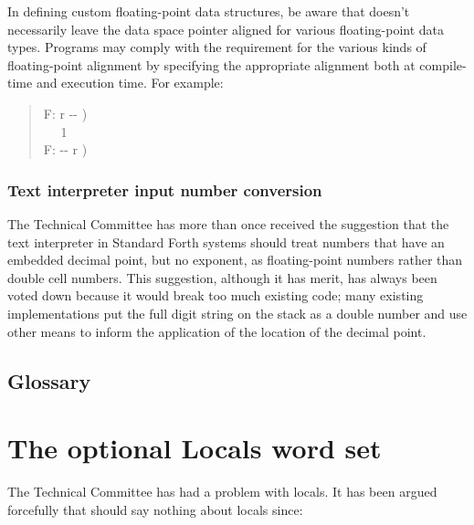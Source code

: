 In defining custom floating-point data structures, be aware that
 doesn't necessarily leave the data space pointer
aligned for various floating-point data types. Programs may comply
with the requirement for the various kinds of floating-point alignment
by specifying the appropriate alignment both at compile-time and
execution time. For example:

\begin{quote}\ttfamily
	\word{:}   F: r -{}- ) \\
	\tab {}  ~~
		1   ~ \\
	\tab {}  F: -{}- r )
		~  \word{;}
\end{quote}

\setcounter{subsubsection}{6}
\subsubsection{Text interpreter input number conversion} %

The Technical Committee has more than once received the suggestion
that the text interpreter in Standard Forth systems should treat
numbers that have an embedded decimal point, but no exponent, as
floating-point numbers rather than double cell numbers. This
suggestion, although it has merit, has always been voted down because
it would break too much existing code; many existing implementations
put the full digit string on the stack as a double number and use
other means to inform the application of the location of the decimal
point.

\setcounter{subsection}{5}
\subsection{Glossary} %



\section{The optional Locals word set} %
\label{rat:local}

The Technical Committee has had a problem with locals. It has been
argued forcefully that  should say nothing about locals
since:


